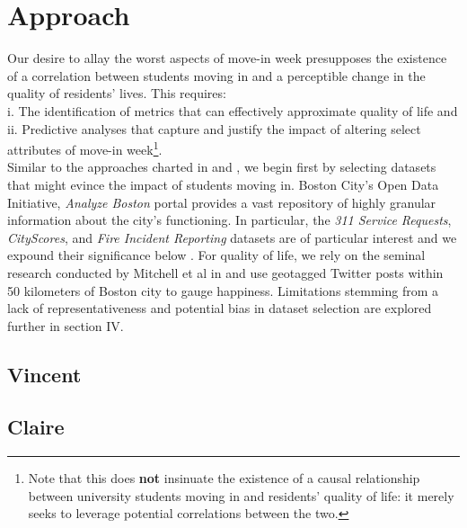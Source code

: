 \documentclass[journal, a4paper]{IEEEtran}
\begin{document}
\section{Approach}
Our desire to allay the worst aspects of move-in week presupposes the existence of a correlation between students moving in and a perceptible change in the quality of residents' lives. This requires: 
\\ \null \quad\quad i. The identification of metrics that can effectively approximate quality of life and
\\\null\quad\quad ii. Predictive analyses that capture and justify the impact of altering select attributes of move-in week\footnote{Note that this does \textbf{not} insinuate the existence of a causal relationship between university students moving in and residents' quality of life: it merely seeks to leverage potential correlations between the two.}.
\\Similar to the approaches charted in \cite{happytext} and \cite{trashcity}, we begin first by selecting datasets that might evince the impact of students moving in. Boston City's Open Data Initiative, \textit{Analyze Boston} portal provides a vast repository of highly granular information about the city's functioning. In particular, the \textit{311 Service Requests}, \textit{CityScores}, and \textit{Fire Incident Reporting} datasets are of particular interest and we expound their significance below \cite{bosdatalink}. For quality of life, we rely on the seminal research conducted by Mitchell et al in \cite{happytexttwitter} and use geotagged Twitter posts within 50 kilometers of Boston city to gauge happiness. Limitations stemming from a lack of representativeness and potential bias in dataset selection are explored further in section IV.
\subsection{Vincent} 
\subsection{Claire}
\end{document}
